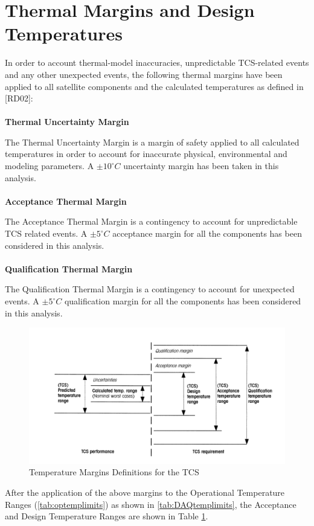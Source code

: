 \section{Thermal Margins and Design Temperatures}

In order to account thermal-model inaccuracies, unpredictable TCS-related events and
any other unexpected events, the following thermal margins have been applied to all
satellite components and the calculated temperatures as defined in [RD02]:
\paragraph{}
\textbf{Thermal Uncertainty Margin}

The Thermal Uncertainty Margin is a margin of safety applied to all calculated
temperatures in order to account for inaccurate physical, environmental and modeling
parameters. A $\pm10 ^\circ C$ uncertainty margin has been taken in this analysis.
\paragraph{}
\textbf{Acceptance Thermal Margin}

The Acceptance Thermal Margin is a contingency to account for unpredictable TCS related
events. A $\pm5 ^\circ C$ acceptance margin for all the components has been considered in
this analysis.

\paragraph{}
\textbf{Qualification Thermal Margin}

The Qualification Thermal Margin is a contingency to account for unexpected events.
A $\pm5 ^\circ C$ qualification margin for all the components has been considered in this analysis.

\begin{figure}[H]
    \centering
    \includegraphics[width=0.6\linewidth]{res/img/2_thermalmargins/DAQTempRangesDiagram.PNG}
    \caption{Temperature Margins Definitions for the TCS}
    \label{fig:DAQTempRanges}
\end{figure}
After the application of the above margins to the Operational Temperature
Ranges (\ref{tab:optemplimits}) as shown in \ref{tab:DAQtemplimits}, the Acceptance and Design Temperature
Ranges are shown in Table \ref{fig:DAQTempRanges}.

